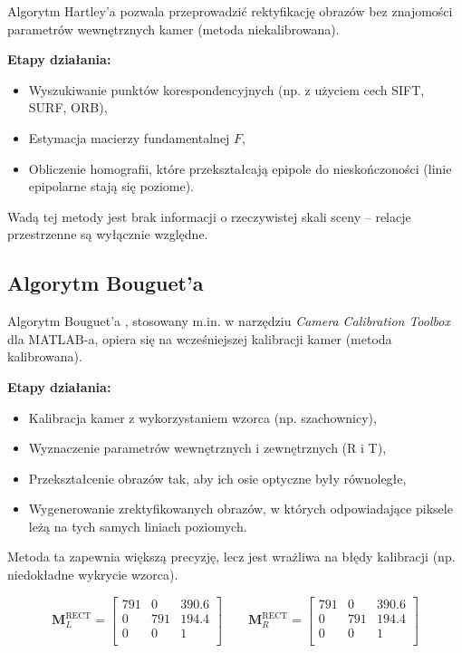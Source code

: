\documentclass[magisterska]{pracadypl}
\begin{document}
Algorytm Hartley’a \cite{hartley} pozwala przeprowadzić rektyfikację obrazów bez znajomości parametrów wewnętrznych kamer (metoda niekalibrowana).

\textbf{Etapy działania:}
\begin{itemize}
    \item Wyszukiwanie punktów korespondencyjnych (np. z użyciem cech SIFT, SURF, ORB),
    \item Estymacja macierzy fundamentalnej $F$,
    \item Obliczenie homografii, które przekształcają epipole do nieskończoności (linie epipolarne stają się poziome).
\end{itemize}

Wadą tej metody jest brak informacji o rzeczywistej skali sceny – relacje przestrzenne są wyłącznie względne.

\subsection{Algorytm Bouguet’a}

Algorytm Bouguet’a \cite{bouget}, stosowany m.in. w narzędziu \textit{Camera Calibration Toolbox} dla MATLAB-a, opiera się na wcześniejszej kalibracji kamer (metoda kalibrowana).

\textbf{Etapy działania:}
\begin{itemize}
    \item Kalibracja kamer z wykorzystaniem wzorca (np. szachownicy),
    \item Wyznaczenie parametrów wewnętrznych i zewnętrznych (R i T),
    \item Przekształcenie obrazów tak, aby ich osie optyczne były równoległe,
    \item Wygenerowanie zrektyfikowanych obrazów, w których odpowiadające piksele leżą na tych samych liniach poziomych.
\end{itemize}

Metoda ta zapewnia większą precyzję, lecz jest wrażliwa na błędy kalibracji (np. niedokładne wykrycie wzorca).

\[
\mathbf{M}_L^\text{RECT} =
\begin{bmatrix}
791 & 0 & 390.6 \\
0 & 791 & 194.4 \\
0 & 0 & 1 \\
\end{bmatrix}
\qquad
\mathbf{M}_R^\text{RECT} =
\begin{bmatrix}
791 & 0 & 390.6 \\
0 & 791 & 194.4 \\
0 & 0 & 1 \\
\end{bmatrix}
\]
\end{document}
